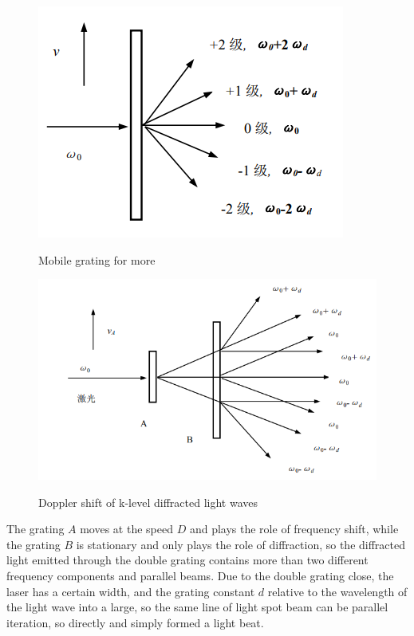 \documentclass[UTF8]{article}
\begin{document}
   \begin{figure}[H]
      \begin{minipage}[t]{0.5\linewidth}
         \centering
         \includegraphics[clip,scale=1,trim={0 0 0 0}]{fig/fig4.png}
         \label{figure.4}
         \caption{Mobile grating for more}
      \end{minipage}
      \begin{minipage}[t]{0.5\linewidth}
         \centering
         \includegraphics[clip,scale=0.7,trim={0 0 10 0}]{fig/fig5.png}
         \label{figure.5}
         \caption{Doppler shift of k-level diffracted light waves}
      \end{minipage}
      	  
   \end{figure} 
   The grating $A$ moves at the speed $D$ and plays the role of frequency shift, while the grating $B$ is stationary and only plays the role of diffraction, so the diffracted light emitted through the double grating contains more than two different frequency components and parallel beams. Due to the double grating close, the laser has a certain width, and the grating constant $d$ relative to the wavelength of the light wave into a large, so the same line of light spot beam can be parallel iteration, so directly and simply formed a light beat.
   
\end{document}
